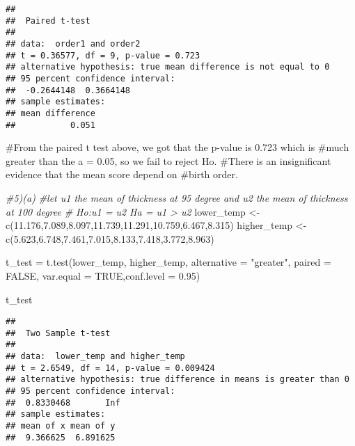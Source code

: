 \documentclass[
]{article}
\newenvironment{Shaded}{\begin{snugshade}}{\end{snugshade}}
\newcommand{\AttributeTok}[1]{\textcolor[rgb]{0.77,0.63,0.00}{#1}}
\newcommand{\CommentTok}[1]{\textcolor[rgb]{0.56,0.35,0.01}{\textit{#1}}}
\newcommand{\ConstantTok}[1]{\textcolor[rgb]{0.00,0.00,0.00}{#1}}
\newcommand{\FloatTok}[1]{\textcolor[rgb]{0.00,0.00,0.81}{#1}}
\newcommand{\FunctionTok}[1]{\textcolor[rgb]{0.00,0.00,0.00}{#1}}
\newcommand{\NormalTok}[1]{#1}
\newcommand{\OtherTok}[1]{\textcolor[rgb]{0.56,0.35,0.01}{#1}}
\newcommand{\StringTok}[1]{\textcolor[rgb]{0.31,0.60,0.02}{#1}}
\begin{document}
\begin{verbatim}
## 
##  Paired t-test
## 
## data:  order1 and order2
## t = 0.36577, df = 9, p-value = 0.723
## alternative hypothesis: true mean difference is not equal to 0
## 95 percent confidence interval:
##  -0.2644148  0.3664148
## sample estimates:
## mean difference 
##           0.051
\end{verbatim}

\#From the paired t test above, we got that the p-value is 0.723 which
is \#much greater than the a = 0.05, so we fail to reject Ho. \#There is
an insignificant evidence that the mean score depend on \#birth order.

\begin{Shaded}
\begin{Highlighting}[]
\CommentTok{\#5)(a)}
\CommentTok{\#let u1  the mean of thickness at 95 degree and u2 the mean of thickness at 100 degree}
\CommentTok{\# Ho:u1 = u2 Ha = u1 \textgreater{} u2}
\NormalTok{lower\_temp }\OtherTok{\textless{}{-}} \FunctionTok{c}\NormalTok{(}\FloatTok{11.176}\NormalTok{,}\FloatTok{7.089}\NormalTok{,}\FloatTok{8.097}\NormalTok{,}\FloatTok{11.739}\NormalTok{,}\FloatTok{11.291}\NormalTok{,}\FloatTok{10.759}\NormalTok{,}\FloatTok{6.467}\NormalTok{,}\FloatTok{8.315}\NormalTok{)}
\NormalTok{higher\_temp }\OtherTok{\textless{}{-}} \FunctionTok{c}\NormalTok{(}\FloatTok{5.623}\NormalTok{,}\FloatTok{6.748}\NormalTok{,}\FloatTok{7.461}\NormalTok{,}\FloatTok{7.015}\NormalTok{,}\FloatTok{8.133}\NormalTok{,}\FloatTok{7.418}\NormalTok{,}\FloatTok{3.772}\NormalTok{,}\FloatTok{8.963}\NormalTok{)}

\NormalTok{t\_test }\OtherTok{=} \FunctionTok{t.test}\NormalTok{(lower\_temp, higher\_temp, }\AttributeTok{alternative =} \StringTok{"greater"}\NormalTok{, }\AttributeTok{paired =} \ConstantTok{FALSE}\NormalTok{, var.equal}
       \OtherTok{=} \ConstantTok{TRUE}\NormalTok{,}\AttributeTok{conf.level =} \FloatTok{0.95}\NormalTok{)}

\NormalTok{t\_test}
\end{Highlighting}
\end{Shaded}

\begin{verbatim}
## 
##  Two Sample t-test
## 
## data:  lower_temp and higher_temp
## t = 2.6549, df = 14, p-value = 0.009424
## alternative hypothesis: true difference in means is greater than 0
## 95 percent confidence interval:
##  0.8330468       Inf
## sample estimates:
## mean of x mean of y 
##  9.366625  6.891625
\end{verbatim}
\end{document}
